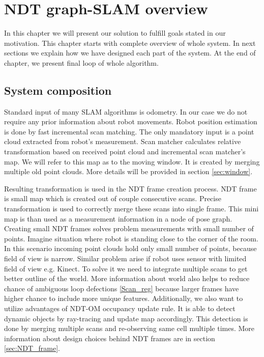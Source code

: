 \chapter{NDT graph-SLAM overview}
In this chapter we will present our solution to fulfill goals stated in our motivation. This chapter starts with complete overview of whole system. In next sections we explain how we have designed each part of the system. At the end of chapter, we present final loop of whole algorithm. 
\section{System composition}
\label{sec:Sys_arch}

Standard input of many \gls{SLAM} algorithms is odometry. In our case we do not require any prior information about robot movements. Robot position estimation is done by fast incremental scan matching. The only mandatory input is a point cloud extracted from robot's measurement. Scan matcher calculates relative transformation based on received point cloud and incremental scan matcher's map. We will refer to this map as to the moving window. It is created by merging multiple old point clouds. More details will be provided in section \ref{sec:window}.

Resulting transformation is used in the \gls{NDT} frame creation process. \gls{NDT} frame is small map which is created out of couple consecutive scans. Precise transformation is used to correctly merge these scans into single frame. This mini map is than used as a measurement information in a node of pose graph. Creating small \gls{NDT} frames solves problem measurements with small number of points. Imagine situation where robot is standing close to the corner of the room. In this scenario incoming point clouds hold only small number of points, because field of view is narrow. Similar problem arise if robot uses sensor with limited field of view e.g. Kinect. To solve it we need to integrate multiple scans to get better outline of the world. More information about world also helps to reduce chance of ambiguous loop defections \ref{Scan_reg} because larger frames have higher chance to include more unique features. Additionally, we also want to utilize advantages of \gls{NDT-OM} occupancy update rule. It is able to detect dynamic objects by ray-tracing and update map accordingly. This detection is done by merging multiple scans and re-observing same cell multiple times. More information about design choices behind \gls{NDT} frames are in section \ref{sec:NDT_frame}.

